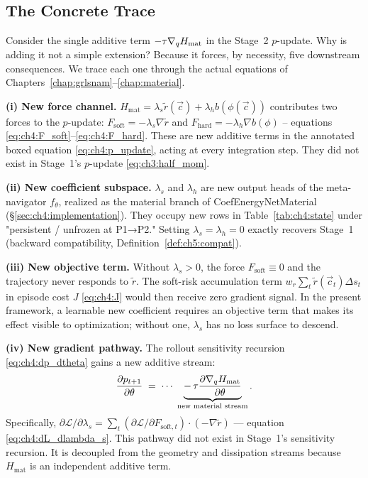 \subsection{The Concrete Trace}
\label{subsec:ch5:trace}

Consider the single additive term $-\tau\nabla_q H_{\mathrm{mat}}$
in the Stage~2 $p$-update.
Why is adding it not a simple extension?
Because it forces, by necessity, five downstream consequences.
We trace each one through the actual equations of
Chapters~\ref{chap:grlsnam}--\ref{chap:material}.

\medskip
\noindent\textbf{(i) New force channel.}
$H_{\mathrm{mat}} = \lambda_s\tilde{r}(\vec{c}) + \lambda_h b(\phi(\vec{c}))$
contributes two forces to the $p$-update:
$F_{\mathrm{soft}} = -\lambda_s\nabla\tilde{r}$ and
$F_{\mathrm{hard}} = -\lambda_h\nabla b(\phi)$
-- equations \eqref{eq:ch4:F_soft}--\eqref{eq:ch4:F_hard}.
These are new additive terms in the annotated boxed equation
\eqref{eq:ch4:p_update}, acting at every integration step.
They did not exist in Stage~1's $p$-update \eqref{eq:ch3:half_mom}.

\medskip
\noindent\textbf{(ii) New coefficient subspace.}
$\lambda_s$ and $\lambda_h$ are new output heads of the meta-navigator
$f_\theta$, realized as the material branch of
CoefEnergyNetMaterial (§\ref{sec:ch4:implementation}).
They occupy new rows in Table~\ref{tab:ch4:state} under
"persistent / unfrozen at P1→P2."
Setting $\lambda_s = \lambda_h = 0$ exactly recovers Stage~1
(backward compatibility, Definition~\ref{def:ch5:compat}).

\medskip
\noindent\textbf{(iii) New objective term.}
Without $\lambda_s > 0$, the force $F_{\mathrm{soft}} \equiv 0$
and the trajectory never responds to $\tilde{r}$.
The soft-risk accumulation term $w_r\sum_t\tilde{r}(\vec{c}_t)\Delta s_t$
in episode cost $J$ \eqref{eq:ch4:J} would then receive zero gradient
signal.
In the present framework, a learnable new coefficient requires an
objective term that makes its effect visible to optimization;
without one, $\lambda_s$ has no loss surface to descend.

\medskip
\noindent\textbf{(iv) New gradient pathway.}
The rollout sensitivity recursion \eqref{eq:ch4:dp_dtheta}
gains a new additive stream:
\[
  \frac{\partial p_{t+1}}{\partial\theta}
  \;=\; \cdots
  \;\underbrace{-\,\tau\frac{\partial\nabla_q H_{\mathrm{mat}}}{\partial\theta}}_{\text{new material stream}}.
\]
Specifically, $\partial\mathcal{L}/\partial\lambda_s =
\sum_t(\partial\mathcal{L}/\partial F_{\mathrm{soft},t})
\cdot(-\nabla\tilde{r})$
— equation \eqref{eq:ch4:dL_dlambda_s}.
This pathway did not exist in Stage~1's sensitivity recursion.
It is decoupled from the geometry and dissipation streams because
$H_{\mathrm{mat}}$ is an independent additive term.

